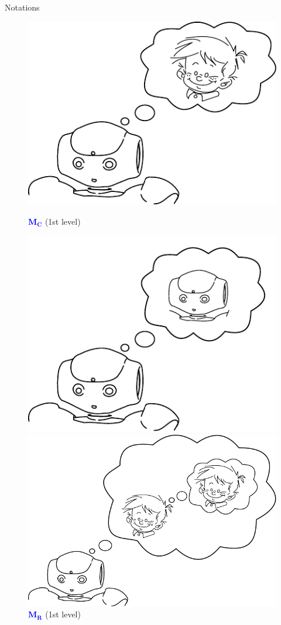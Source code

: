 \documentclass[compress]{beamer}
\begin{document}
\begin{frame}{Notations}
\begin{figure}[!tbp]
	\begin{minipage}[b]{.4\textwidth}
		\includegraphics[width=0.8\columnwidth]{naoMM}
		\caption{\textcolor{blue}{$\textbf{M}_{\textbf{C}}$} (1st level)}
	\end{minipage}
	\hfill
	\begin{minipage}[b]{.4\textwidth}
		\includegraphics[width=0.8\columnwidth]{naoMM4}
		\caption{\textcolor{blue}{$\textbf{M}_{\textbf{R}}$} (1st level)}
	\end{minipage}
	\hfill
	\begin{minipage}[b]{.4\textwidth}
		\includegraphics[width=0.8\columnwidth]{naoMM3}

\end{minipage}
\end{figure}
\end{frame}
\end{document}
